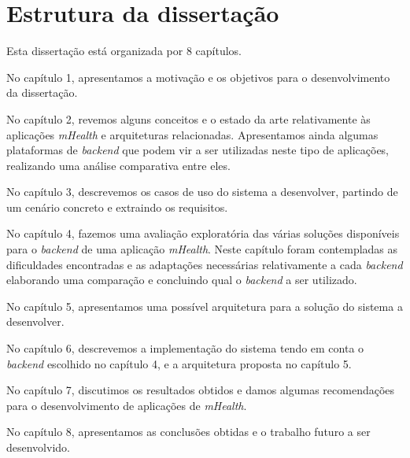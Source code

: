 \section{Estrutura da dissertação}
Esta dissertação está organizada por 8 capítulos.\par 
No capítulo 1, apresentamos a motivação e os objetivos para o desenvolvimento da dissertação.\par 
No capítulo 2, revemos alguns conceitos e o estado da arte relativamente às aplicações \textit{mHealth} e arquiteturas relacionadas. Apresentamos ainda algumas plataformas de \textit{backend} que podem vir a ser utilizadas neste tipo de aplicações, realizando uma análise comparativa entre eles.\par 
No capítulo 3, descrevemos os casos de uso do sistema a desenvolver, partindo de um cenário concreto e extraindo os requisitos.\par 
No capítulo 4, fazemos uma avaliação exploratória das várias soluções disponíveis para o \textit{backend} de uma aplicação \textit{mHealth}. Neste capítulo foram contempladas as dificuldades encontradas e as adaptações necessárias relativamente a cada \textit{backend} elaborando uma comparação e concluindo qual o \textit{backend} a ser utilizado. \par
No capítulo 5, apresentamos uma possível arquitetura para a solução do sistema a desenvolver. \par 
No capítulo 6, descrevemos a implementação do sistema tendo em conta o \textit{backend} escolhido no capítulo 4, e a arquitetura proposta no capítulo 5. \par 
No capítulo 7, discutimos os resultados obtidos e damos algumas recomendações para o desenvolvimento de aplicações de \textit{mHealth}. \par 
No capítulo 8, apresentamos as conclusões obtidas e o trabalho futuro a ser desenvolvido.
\cleardoublepage